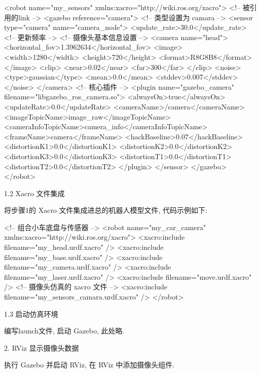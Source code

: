 \documentclass[openany, fontset=windowsold]{ctexbook}
\theoremstyle{kaiti}
\theoremstyle{normal}
\begin{document}
\begin{xml}
  <robot name="my_sensors" xmlns:xacro="http://wiki.ros.org/xacro">
    <!-- 被引用的link -->
    <gazebo reference="camera">
      <!-- 类型设置为 camara -->
      <sensor type="camera" name="camera_node">
        <update_rate>30.0</update_rate> <!-- 更新频率 -->
        <!-- 摄像头基本信息设置 -->
        <camera name="head">
          <horizontal_fov>1.3962634</horizontal_fov>
          <image>
            <width>1280</width>
            <height>720</height>
            <format>R8G8B8</format>
          </image>
          <clip>
            <near>0.02</near>
            <far>300</far>
          </clip>
          <noise>
            <type>gaussian</type>
            <mean>0.0</mean>
            <stddev>0.007</stddev>
          </noise>
        </camera>
        <!-- 核心插件 -->
        <plugin name="gazebo_camera" filename="libgazebo_ros_camera.so">
          <alwaysOn>true</alwaysOn>
          <updateRate>0.0</updateRate>
          <cameraName>/camera</cameraName>
          <imageTopicName>image_raw</imageTopicName>
          <cameraInfoTopicName>camera_info</cameraInfoTopicName>
          <frameName>camera</frameName>
          <hackBaseline>0.07</hackBaseline>
          <distortionK1>0.0</distortionK1>
          <distortionK2>0.0</distortionK2>
          <distortionK3>0.0</distortionK3>
          <distortionT1>0.0</distortionT1>
          <distortionT2>0.0</distortionT2>
        </plugin>
      </sensor>
    </gazebo>
  </robot>
\end{xml}

1.2 Xacro 文件集成

将步骤1的 Xacro 文件集成进总的机器人模型文件, 代码示例如下:

\begin{xml}
  <!-- 组合小车底盘与传感器 -->
  <robot name="my_car_camera" xmlns:xacro="http://wiki.ros.org/xacro">
      <xacro:include filename="my_head.urdf.xacro" />
      <xacro:include filename="my_base.urdf.xacro" />
      <xacro:include filename="my_camera.urdf.xacro" />
      <xacro:include filename="my_laser.urdf.xacro" />
      <xacro:include filename="move.urdf.xacro" />
      <!-- 摄像头仿真的 xacro 文件 -->
      <xacro:include filename="my_sensors_camara.urdf.xacro" />
  </robot>
\end{xml}

1.3 启动仿真环境

编写launch文件, 启动 Gazebo, 此处略.

2. RViz 显示摄像头数据

执行 Gazebo 并启动 RViz, 在 RViz 中添加摄像头组件.
\end{document}
